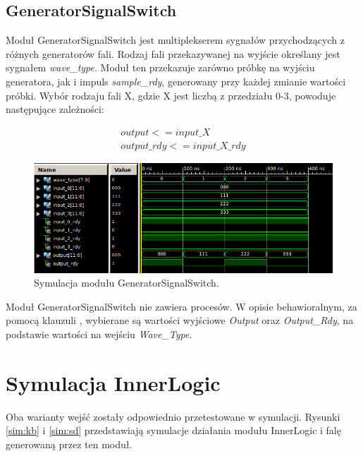 \documentclass[a4paper,12pt]{article}
\begin{document}
\subsection{GeneratorSignalSwitch}

Moduł GeneratorSignalSwitch jest multiplekserem sygnałów przychodzących z różnych generatorów fali. Rodzaj fali przekazywanej na wyjście określany jest sygnałem \textit{wave\_type}. Moduł ten przekazuje zarówno próbkę na wyjściu generatora, jak i impuls \textit{sample\_rdy}, generowany przy każdej zmianie wartości próbki. Wybór rodzaju fali X, gdzie X jest liczbą z przedziału 0-3, powoduje następujące zależności:
\clearpage

\begin{gather*}
output <= input\_X \\
output\_rdy <= input\_X\_rdy
\end{gather*}

\begin{figure}[h]
  \centering
  \includegraphics[decodearray={1 0 1 0 1 0}, width=\linewidth]{images/generator_signal_switch.png}
  \caption{Symulacja modułu GeneratorSignalSwitch.}
  \label{sim:gen_signal_switch}
\end{figure}

Moduł GeneratorSignalSwitch nie zawiera procesów. W opisie behawioralnym, za pomocą klauzuli , wybierane są wartości wyjściowe \textit{Output} oraz \textit{Output\_Rdy}, na podstawie wartości na wejściu \textit{Wave\_Type}.

\section{Symulacja InnerLogic}
Oba warianty wejść zostały odpowiednio przetestowane w symulacji. Rysunki \ref{sim:kb} i \ref{sim:sd} przedstawiają symulacje działania modułu InnerLogic i falę generowaną przez ten moduł.
\end{document}
